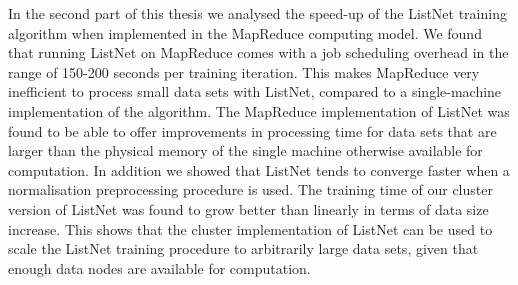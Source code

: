 In the second part of this thesis we analysed the speed-up of the ListNet training algorithm when implemented in the MapReduce computing model. We found that running ListNet on MapReduce comes with a job scheduling overhead in the range of 150-200 seconds per training iteration. This makes MapReduce very inefficient to process small data sets with ListNet, compared to a single-machine implementation of the algorithm. The MapReduce implementation of ListNet was found to be able to offer improvements in processing time for data sets that are larger than the physical memory of the single machine otherwise available for computation. In addition we showed that ListNet tends to converge faster when a normalisation preprocessing procedure is used. The training time of our cluster version of ListNet was found to grow better than linearly in terms of data size increase. This shows that the cluster implementation of ListNet can be used to scale the ListNet training procedure to arbitrarily large data sets, given that enough data nodes are available for computation.



\endgroup			

\vfill